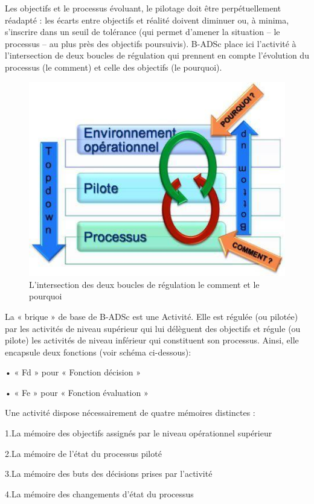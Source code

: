 Les objectifs et le processus évoluant, le pilotage doit être perpétuellement réadapté : les écarts entre objectifs et réalité doivent diminuer ou, à minima, s’inscrire dans un seuil de tolérance (qui permet d’amener la situation – le processus – au plus près des objectifs poursuivis).
B-ADSc place ici l'activité à l’intersection de deux boucles de régulation qui prennent en compte l’évolution du processus (le comment) et celle des objectifs (le pourquoi).
 
 \begin{figure}[H]
\begin{center}
\includegraphics[width=0.5\linewidth]{images/comment_pourquoi}
\end{center}
\caption{L'intersection des deux boucles de régulation le comment et le pourquoi}
\label{fig:10}
\end{figure}
La « brique » de base de B-ADSc est une Activité. Elle est régulée (ou pilotée) par les activités de niveau supérieur qui lui délèguent des objectifs et régule (ou pilote) les activités de niveau inférieur qui constituent son processus.
Ainsi, elle encapsule deux fonctions
(voir schéma ci-dessous):

• « Fd » pour « Fonction décision » 

• « Fe » pour « Fonction évaluation » 

Une activité dispose nécessairement de quatre mémoires distinctes :

1.La mémoire des objectifs assignés par le niveau opérationnel supérieur 

2.La mémoire de l'état du processus piloté 

3.La mémoire des buts des décisions prises par l’activité 

4.La mémoire des changements d’état du processus

